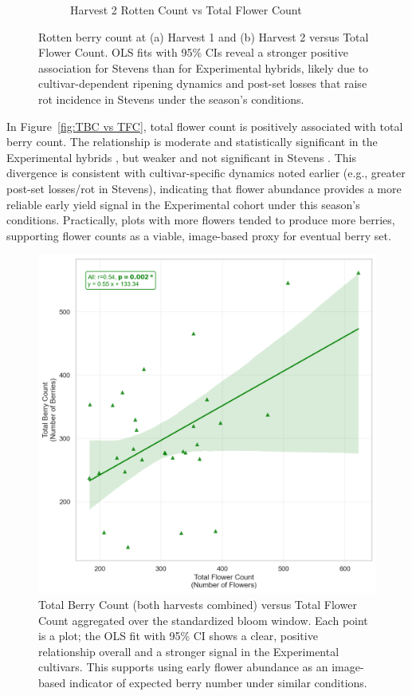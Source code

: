 \begin{figure}[!ht]
\begin{subfigure}{0.5\textwidth}
   \caption{Harvest 2 Rotten Count vs Total Flower Count}
    \label{fig:H2 RC vs TFC}
  \end{subfigure}
  \caption{Rotten berry count at (a) Harvest 1 and (b) Harvest 2 versus Total Flower Count. OLS fits with 95\% CIs reveal a stronger positive association for Stevens than for Experimental hybrids, likely due to cultivar-dependent ripening dynamics and post-set losses that raise rot incidence in Stevens under the season’s conditions.}
  \label{fig:RC vs TFC}
\end{figure}

In Figure~\ref{fig:TBC vs TFC}, total flower count is positively associated with total berry count. The relationship is moderate and statistically significant in the Experimental hybrids , but weaker and not significant in Stevens . This divergence is consistent with cultivar-specific dynamics noted earlier (e.g., greater post-set losses/rot in Stevens), indicating that flower abundance provides a more reliable early yield signal in the Experimental cohort under this season’s conditions. Practically, plots with more flowers tended to produce more berries, supporting flower counts as a viable, image-based proxy for eventual berry set.


\begin{figure}[H]
    \centering
    \includegraphics[width=0.75\linewidth]{images/TBC to TFC all Cultivars.png}
    \caption{Total Berry Count (both harvests combined) versus Total Flower Count aggregated over the standardized bloom window. Each point is a plot; the OLS fit with 95\% CI shows a clear, positive relationship overall and a stronger signal in the Experimental cultivars. This supports using early flower abundance as an image-based indicator of expected berry number under similar conditions.}
    \label{fig:TBC vs TFC APT}
\end{figure}

